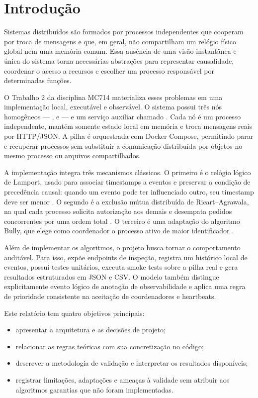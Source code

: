 \section{Introdução}

Sistemas distribuídos são formados por processos independentes que cooperam por troca de mensagens e que, em geral, não compartilham um relógio físico global nem uma memória comum. Essa ausência de uma visão instantânea e única do sistema torna necessárias abstrações para representar causalidade, coordenar o acesso a recursos e escolher um processo responsável por determinadas funções.

O Trabalho 2 da disciplina MC714 materializa esses problemas em uma implementação local, executável e observável. O sistema possui três nós homogêneos --- ,  e  --- e um serviço auxiliar chamado . Cada nó é um processo independente, mantém somente estado local em memória e troca mensagens reais por HTTP/JSON. A pilha é orquestrada com Docker Compose, permitindo parar e recuperar processos sem substituir a comunicação distribuída por objetos no mesmo processo ou arquivos compartilhados.

A implementação integra três mecanismos clássicos. O primeiro é o relógio lógico de Lamport, usado para associar timestamps a eventos e preservar a condição de precedência causal: quando um evento pode ter influenciado outro, seu timestamp deve ser menor \cite{lamport1978}. O segundo é a exclusão mútua distribuída de Ricart--Agrawala, na qual cada processo solicita autorização aos demais e desempata pedidos concorrentes por uma ordem total \cite{ricart1981}. O terceiro é uma adaptação do algoritmo Bully, que elege como coordenador o processo ativo de maior identificador \cite{garcia1982}.

Além de implementar os algoritmos, o projeto busca tornar o comportamento auditável. Para isso, expõe endpoints de inspeção, registra um histórico local de eventos, possui testes unitários, executa smoke tests sobre a pilha real e gera resultados estruturados em JSON e CSV. O modelo também distingue explicitamente evento lógico de anotação de observabilidade e aplica uma regra de prioridade consistente na aceitação de coordenadores e heartbeats.

Este relatório tem quatro objetivos principais:

\begin{itemize}
    \item apresentar a arquitetura e as decisões de projeto;
    \item relacionar as regras teóricas com sua concretização no código;
    \item descrever a metodologia de validação e interpretar os resultados disponíveis;
    \item registrar limitações, adaptações e ameaças à validade sem atribuir aos algoritmos garantias que não foram implementadas.
\end{itemize}

